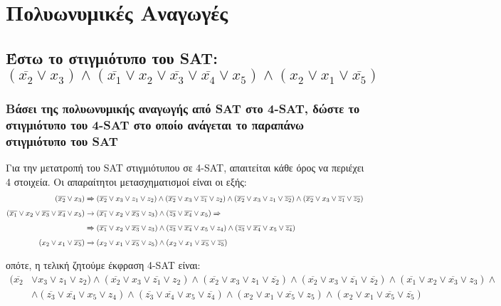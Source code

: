 \section{Πολυωνυμικές Αναγωγές}

\subsection{Έστω το στιγμιότυπο του SAT: $(\overline{x_2} \lor x_3) \wedge (\overline{x_1} \lor x_2 \lor \overline{x_3} \lor \overline{x_4} \lor x_5) \wedge (x_2 \lor x_1 \lor \overline{x_5})$}

\subsubsection{Βάσει της πολυωνυμικής αναγωγής από SAT στο 4-SAT, δώστε το στιγμιότυπο του 4-SAT στο οποίο ανάγεται το παραπάνω στιγμιότυπο του SAT}

Για την μετατροπή του SAT στιγμιότυπου σε 4-SAT, απαιτείται κάθε όρος να περιέχει 4 στοιχεία. Οι απαραίτητοι μετασχηματισμοί είναι οι εξής: 
\begin{align}
	(\overline{x_2} \lor x_3) &\xRightarrow{} (\overline{x_2} \lor x_3 \lor z_1 \lor z_2) \wedge (\overline{x_2} \lor x_3 \lor \overline{z_1} \lor z_2) \wedge (\overline{x_2} \lor x_3 \lor z_1 \lor \overline{z_2}) \wedge (\overline{x_2} \lor x_3 \lor \overline{z_1} \lor \overline{z_2})\\
	(\overline{x_1} \lor x_2 \lor \overline{x_3} \lor \overline{x_4} \lor x_5) &\xrightarrow{} (\overline{x_1} \lor x_2 \lor \overline{x_3} \lor z_3) \wedge (\overline{z_3} \lor \overline{x_4} \lor x_5) \xRightarrow{} \notag\\
												&\xRightarrow{} (\overline{x_1} \lor x_2 \lor \overline{x_3} \lor z_3) \wedge (\overline{z_3} \lor \overline{x_4} \lor x_5 \lor z_4) \wedge (\overline{z_3} \lor \overline{x_4} \lor x_5 \lor \overline{z_4})\\
	(x_2 \lor x_1 \lor \overline{x_5}) &\xrightarrow{} (x_2 \lor x_1 \lor \overline{x_5} \lor z_5) \wedge (x_2 \lor x_1 \lor \overline{x_5} \lor \overline{z_5})
\end{align}

οπότε, η τελική ζητούμε έκφραση 4-SAT είναι:
\begin{align*}
	(\overline{x_2} &\lor x_3 \lor z_1 \lor z_2)   \wedge   (\overline{x_2} \lor x_3 \lor \overline{z_1} \lor z_2)   \wedge   (\overline{x_2} \lor x_3 \lor z_1 \lor \overline{z_2}) \wedge   (\overline{x_2} \lor x_3 \lor \overline{z_1} \lor \overline{z_2})   \wedge   (\overline{x_1} \lor x_2 \lor \overline{x_3} \lor z_3) \wedge \\&\wedge (\overline{z_3} \lor \overline{x_4} \lor x_5 \lor z_4) \wedge (\overline{z_3} \lor \overline{x_4} \lor x_5 \lor \overline{z_4}) \wedge (x_2 \lor x_1 \lor \overline{x_5} \lor z_5) \wedge (x_2 \lor x_1 \lor \overline{x_5} \lor \overline{z_5})
\end{align*}
\clearpage
